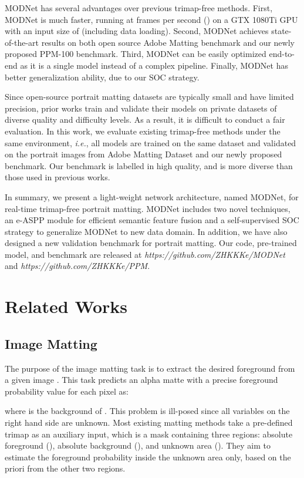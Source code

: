 \documentclass[letterpaper]{article} \usepackage{aaai22}  \usepackage{times}  \usepackage{helvet}  \usepackage{courier}  \usepackage[hyphens]{url}  \usepackage{graphicx} \urlstyle{rm} \def\UrlFont{\rm}  \usepackage{natbib}  \usepackage{caption} \usepackage{booktabs}
\begin{document}
MODNet has several advantages over previous trimap-free methods. 
First, MODNet is much faster, running at  frames per second () on a GTX 1080Ti GPU with an input size of  (including data loading). 
Second, MODNet achieves state-of-the-art results on both open source Adobe Matting benchmark and our newly proposed PPM-100 benchmark.
Third, MODNet can be easily optimized end-to-end as it is a single model instead of a complex pipeline. Finally, MODNet has better generalization ability, due to our SOC strategy. 

Since open-source portrait matting datasets \cite{DAPM, DIM} are typically small and have limited precision, prior works train and validate their models on private datasets of diverse quality and difficulty levels. As a result, it is difficult to conduct a fair evaluation. In this work, we evaluate existing trimap-free methods under the same environment, {\it i.e.}, all models are trained on the same dataset and validated on the portrait images from Adobe Matting Dataset \cite{DIM} and our newly proposed benchmark. Our benchmark is labelled in high quality, and is more diverse than those used in previous works.


In summary, we present a light-weight network architecture, named MODNet, for real-time trimap-free portrait matting. MODNet includes two novel techniques, an e-ASPP module for efficient semantic feature fusion and a self-supervised SOC strategy to generalize MODNet to new data domain. In addition, we have also designed a new validation benchmark for portrait matting. Our code, pre-trained model, and benchmark are released at {\it https://github.com/ZHKKKe/MODNet} and {\it https://github.com/ZHKKKe/PPM}.

\section{Related Works}
\subsection{Image Matting}
The purpose of the image matting task is to extract the desired foreground  from a given image . 
This task predicts an alpha matte with a precise foreground probability value  for each pixel  as:

where  is the background of . This problem is ill-posed since all variables on the right hand side are unknown. Most existing matting methods take a pre-defined trimap as an auxiliary input, which is a mask containing three regions: absolute foreground (), absolute background (), and unknown area (). They aim to estimate the foreground probability inside the unknown area only, based on the priori from the other two regions.
\end{document}
